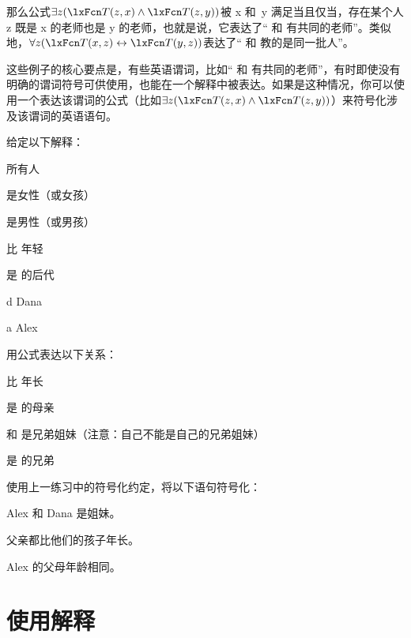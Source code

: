 那么公式$\exists z(\atom{T}{z,x} \land \atom{T}{z,y})$被 x 和~y 满足当且仅当，存在某个人 z 既是 x 的老师也是 y 的老师，也就是说，它表达了“ 和  有共同的老师”。类似地，$\forall z(\atom{T}{x,z} \eiff \atom{T}{y,
z})$表达了“ 和  教的是同一批人”。

这些例子的核心要点是，有些英语谓词，比如“ 和  有共同的老师”，有时即使没有明确的谓词符号可供使用，也能在一个解释中被表达。如果是这种情况，你可以使用一个表达该谓词的公式（比如$\exists
z(\atom{T}{z,x} \land \atom{T}{z,y})$）来符号化涉及该谓词的英语语句。

\practiceproblems

\problempart
给定以下解释：


\begin{ekey}
	\item[\text{论域}] 所有人
	\item[\atom{W}{x}]  是女性（或女孩）
	\item[\atom{M}{x}]  是男性（或男孩）
	\item[\atom{Y}{x,y}]  比  年轻
	\item[\atom{O}{x,y}]  是  的后代
	\item[d] Dana
	\item[a] Alex
\end{ekey}


用公式表达以下关系：


\begin{compactlist}
	\item {} 比  年长
	\item {} 是  的母亲
	\item {} 和  是兄弟姐妹（注意：自己不能是自己的兄弟姐妹）
	\item {} 是  的兄弟
\end{compactlist}

\problempart
使用上一练习中的符号化约定，将以下语句符号化：


\begin{compactlist}
	\item Alex 和 Dana 是姐妹。
	\item 父亲都比他们的孩子年长。
	\item Alex 的父母年龄相同。
\end{compactlist}

\chapter{使用解释}
\label{sec.UsingModels}

